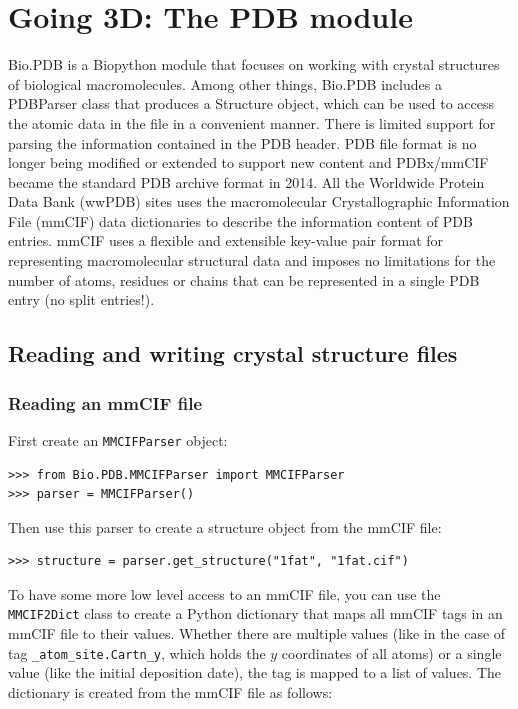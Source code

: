\chapter{Going 3D: The PDB module}
\label{chapter:pdb}

Bio.PDB is a Biopython module that focuses on working with crystal structures of biological macromolecules. Among other things, Bio.PDB includes a PDBParser class that produces a Structure object, which can be used to access the atomic data in the file in a convenient manner. There is limited support for parsing the information contained in the PDB header. PDB file format is no longer being modified or extended to support new content and PDBx/mmCIF became the standard PDB archive format in 2014. All the Worldwide Protein Data Bank (wwPDB) sites uses the macromolecular Crystallographic Information File (mmCIF) data dictionaries to describe the information content of PDB entries. mmCIF uses a flexible and extensible key-value pair format for representing macromolecular structural data and imposes no limitations for the number of atoms, residues or chains that can be represented in a single PDB entry (no split entries!).


\section{Reading and writing crystal structure files}

\subsection{Reading an mmCIF file}

First create an \texttt{MMCIFParser} object:

\begin{verbatim}
>>> from Bio.PDB.MMCIFParser import MMCIFParser
>>> parser = MMCIFParser()
\end{verbatim}
Then use this parser to create a structure object from the mmCIF file:
\begin{verbatim}
>>> structure = parser.get_structure("1fat", "1fat.cif")
\end{verbatim}

To have some more low level access to an mmCIF file, you can use the \verb+MMCIF2Dict+ class to create a Python dictionary that maps all mmCIF
tags in an mmCIF file to their values. Whether there are multiple values
(like in the case of tag \verb+_atom_site.Cartn_y+, which holds
the $y$ coordinates of all atoms) or a single value (like the initial deposition date), the tag is mapped to a list of values.
The dictionary is created from the mmCIF file as follows:

